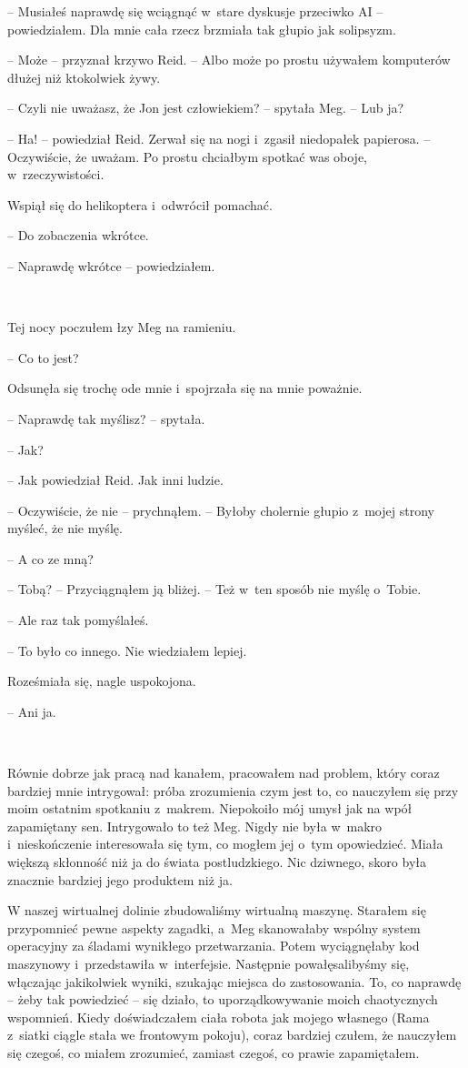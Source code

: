 \documentclass[oneside,polish,11pt,sfheadings]{mwbk}
\begin{document}
-- Musiałeś naprawdę się wciągnąć w~stare dyskusje przeciwko AI -- powiedziałem. Dla mnie cała rzecz brzmiała tak głupio jak solipsyzm.

-- Może -- przyznał krzywo Reid. -- Albo może po prostu używałem komputerów
dłużej niż ktokolwiek żywy.

-- Czyli nie uważasz, że Jon jest człowiekiem? -- spytała Meg. -- Lub ja?

-- Ha! -- powiedział Reid. Zerwał się na nogi i~zgasił niedopałek
papierosa. -- Oczywiście, że uważam. Po prostu chciałbym spotkać was
oboje, w~rzeczywistości.

Wspiął się do helikoptera i~odwrócił pomachać.

-- Do zobaczenia wkrótce.

-- Naprawdę wkrótce -- powiedziałem.

~

Tej nocy poczułem łzy Meg na ramieniu.

-- Co to jest?

Odsunęła się trochę ode mnie i~spojrzała się na mnie poważnie.

-- Naprawdę tak myślisz? -- spytała.

-- Jak?

-- Jak powiedział Reid. Jak inni ludzie.

-- Oczywiście, że nie -- prychnąłem. -- Byłoby cholernie głupio z~mojej
strony myśleć, że nie myślę.

-- A co ze mną?

-- Tobą? -- Przyciągnąłem ją bliżej. -- Też w~ten sposób nie myślę o~Tobie.

-- Ale raz tak pomyślałeś.

-- To było co innego. Nie wiedziałem lepiej.

Roześmiała się, nagle uspokojona.

-- Ani ja.

~

Równie dobrze jak pracą nad kanałem, pracowałem nad problem, który coraz
bardziej mnie intrygował: próba zrozumienia czym jest to, co nauczyłem
się przy moim ostatnim spotkaniu z~makrem. Niepokoiło mój umysł jak na
wpół zapamiętany sen. Intrygowało to też Meg. Nigdy nie była w~makro i~nieskończenie interesowała się tym, co mogłem jej o~tym opowiedzieć.
Miała większą skłonność niż ja do świata postludzkiego. Nic dziwnego,
skoro była znacznie bardziej jego produktem niż ja.

W naszej wirtualnej dolinie zbudowaliśmy wirtualną maszynę. Starałem się
przypomnieć pewne aspekty zagadki, a~Meg skanowałaby wspólny system
operacyjny za śladami wynikłego przetwarzania. Potem wyciągnęłaby kod
maszynowy i~przedstawiła w~interfejsie. Następnie powałęsalibyśmy się,
włączając jakikolwiek wyniki, szukając miejsca do zastosowania. To, co
naprawdę -- żeby tak powiedzieć -- się działo, to uporządkowywanie moich
chaotycznych wspomnień. Kiedy doświadczałem ciała robota jak mojego
własnego (Rama z~siatki ciągle stała we frontowym pokoju), coraz
bardziej czułem, że nauczyłem się czegoś, co miałem zrozumieć, zamiast
czegoś, co prawie zapamiętałem.
\end{document}
